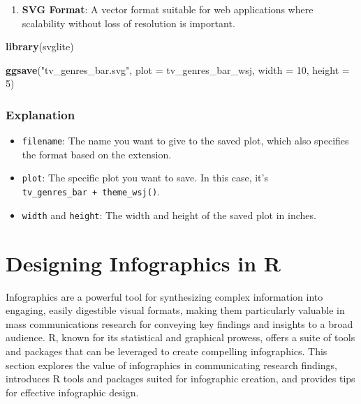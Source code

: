 \documentclass[
]{book}
\newenvironment{Shaded}{\begin{snugshade}}{\end{snugshade}}
\newcommand{\AttributeTok}[1]{\textcolor[rgb]{0.13,0.29,0.53}{#1}}
\newcommand{\DecValTok}[1]{\textcolor[rgb]{0.00,0.00,0.81}{#1}}
\newcommand{\FunctionTok}[1]{\textcolor[rgb]{0.13,0.29,0.53}{\textbf{#1}}}
\newcommand{\NormalTok}[1]{#1}
\newcommand{\StringTok}[1]{\textcolor[rgb]{0.31,0.60,0.02}{#1}}
\providecommand{\tightlist}{%
  \setlength{\itemsep}{0pt}\setlength{\parskip}{0pt}}
\begin{document}
\begin{enumerate}
\def\labelenumi{\arabic{enumi}.}
\setcounter{enumi}{3}
\tightlist
\item
  \textbf{SVG Format}: A vector format suitable for web applications where scalability without loss of resolution is important.
\end{enumerate}

\begin{Shaded}
\begin{Highlighting}[]
\FunctionTok{library}\NormalTok{(svglite)}

\FunctionTok{ggsave}\NormalTok{(}\StringTok{"tv\_genres\_bar.svg"}\NormalTok{, }\AttributeTok{plot =}\NormalTok{ tv\_genres\_bar\_wsj, }\AttributeTok{width =} \DecValTok{10}\NormalTok{, }\AttributeTok{height =} \DecValTok{5}\NormalTok{)}
\end{Highlighting}
\end{Shaded}

\subsubsection*{Explanation}\label{explanation}

\begin{itemize}
\tightlist
\item
  \texttt{filename}: The name you want to give to the saved plot, which also specifies the format based on the extension.
\item
  \texttt{plot}: The specific plot you want to save. In this case, it's \texttt{tv\_genres\_bar\ +\ theme\_wsj()}.
\item
  \texttt{width} and \texttt{height}: The width and height of the saved plot in inches.
\end{itemize}

\section{Designing Infographics in R}\label{designing-infographics-in-r}

Infographics are a powerful tool for synthesizing complex information into engaging, easily digestible visual formats, making them particularly valuable in mass communications research for conveying key findings and insights to a broad audience. R, known for its statistical and graphical prowess, offers a suite of tools and packages that can be leveraged to create compelling infographics. This section explores the value of infographics in communicating research findings, introduces R tools and packages suited for infographic creation, and provides tips for effective infographic design.
\end{document}
